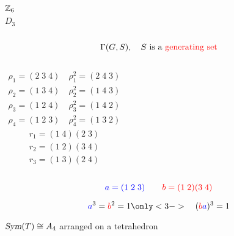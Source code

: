 \begin{frame}
  \begin{center}
  \end{center}
\end{frame}

\begin{frame}
  \begin{columns}
	  \[
		\mathbb{Z}_{6}
	  \]
	  \[
		D_3
	  \]
  \end{columns}

  \pause
  \vspace{0.50cm}
  \[
	\Gamma(G, S),\quad S \text{ is a \textcolor{red}{generating set}}
  \]
\end{frame}

\begin{frame}
  \begin{columns}
	  \begin{align*}
		\rho_{1} = (2\; 3\; 4)\quad \rho_{1}^{2} = (2\; 4\; 3) \\[3pt]
		\rho_{2} = (1\; 3\; 4)\quad \rho_{2}^{2} = (1\; 4\; 3) \\[3pt]
		\rho_{3} = (1\; 2\; 4)\quad \rho_{3}^{2} = (1\; 4\; 2) \\[3pt]
		\rho_{4} = (1\; 2\; 3)\quad \rho_{4}^{2} = (1\; 3\; 2)
	  \end{align*}
	  \begin{align*}
		r_1 = (1\; 4) (2\; 3) \\[6pt]
		r_2 = (1\; 2) (3\; 4) \\[6pt]
		r_3 = (1\; 3) (2\; 4)
	  \end{align*}
  \end{columns}

  \pause
  \vspace{0.60cm}
  \[
	\textcolor{blue}{a = (1\; 2\; 3)} \qquad \textcolor{red}{b = (1\; 2) (3\; 4)}
  \]
\end{frame}

\begin{frame}
  \begin{center}
	\resizebox{0.70\textwidth}{!}{}
  \end{center}

  \vspace{-0.80cm}
  \[
	\blue{a}^3 = \red{b}^2 = 1 \only<3->{\quad (\red{b}\blue{a})^3 = 1}
  \]
\end{frame}

\begin{frame}
  \begin{center}
	$\textsl{Sym}(T) \cong A_4$ arranged on a  tetrahedron
  \end{center}
\end{frame}
